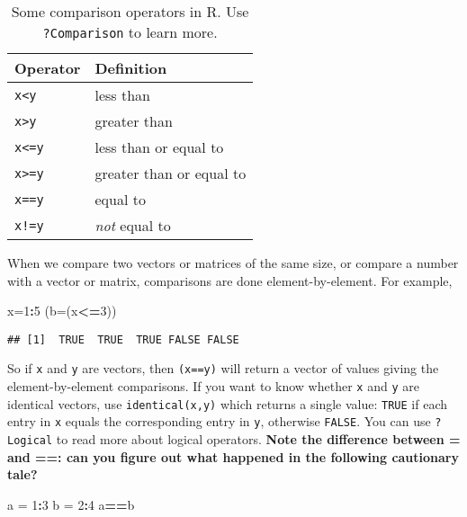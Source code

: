 \documentclass[11pt,]{article}
\newenvironment{Shaded}{\begin{snugshade}}{\end{snugshade}}
\newcommand{\DataTypeTok}[1]{\textcolor[rgb]{0.13,0.29,0.53}{#1}}
\newcommand{\DecValTok}[1]{\textcolor[rgb]{0.00,0.00,0.81}{#1}}
\newcommand{\StringTok}[1]{\textcolor[rgb]{0.31,0.60,0.02}{#1}}
\newcommand{\OperatorTok}[1]{\textcolor[rgb]{0.81,0.36,0.00}{\textbf{#1}}}
\newcommand{\NormalTok}[1]{#1}
\begin{document}
\begin{table}

\caption{\label{tab:unnamed-chunk-47}Some comparison operators in R. Use \texttt{?Comparison} to learn more.}
\centering
\begin{tabular}[t]{ll}
\toprule
Operator & Definition\\
\midrule
\texttt{x<y} & less than\\
\texttt{x>y} & greater than\\
\texttt{x<=y} & less than or equal to\\
\texttt{x>=y} & greater than or equal to\\
\texttt{x==y} & equal to\\
\texttt{x!=y} & \emph{not} equal to\\
\bottomrule
\end{tabular}
\end{table}

When we compare two vectors or matrices of the same size, or compare a
number with a vector or matrix, comparisons are done element-by-element.
For example,

\begin{Shaded}
\begin{Highlighting}[]
\NormalTok{x=}\DecValTok{1}\OperatorTok{:}\DecValTok{5}
\NormalTok{(}\DataTypeTok{b=}\NormalTok{(x}\OperatorTok{<=}\DecValTok{3}\NormalTok{))}
\end{Highlighting}
\end{Shaded}

\begin{verbatim}
## [1]  TRUE  TRUE  TRUE FALSE FALSE
\end{verbatim}

So if \texttt{x} and \texttt{y} are vectors, then \texttt{(x==y)} will
return a vector of values giving the element-by-element comparisons. If
you want to know whether \texttt{x} and \texttt{y} are identical
vectors, use \texttt{identical(x,y)} which returns a single value:
\texttt{TRUE} if each entry in \texttt{x} equals the corresponding entry
in \texttt{y}, otherwise \texttt{FALSE}. You can use \texttt{?Logical}
to read more about logical operators. \textbf{Note the difference
between = and ==: can you figure out what happened in the following
cautionary tale?}

\begin{Shaded}
\begin{Highlighting}[]
\NormalTok{a =}\StringTok{ }\DecValTok{1}\OperatorTok{:}\DecValTok{3}
\NormalTok{b =}\StringTok{ }\DecValTok{2}\OperatorTok{:}\DecValTok{4}
\NormalTok{a}\OperatorTok{==}\NormalTok{b}
\end{Highlighting}
\end{Shaded}
\end{document}

